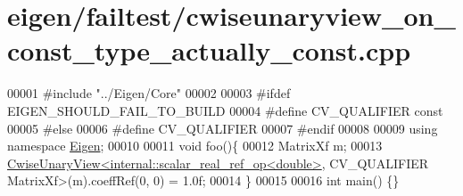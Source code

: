 \hypertarget{eigen_2failtest_2cwiseunaryview__on__const__type__actually__const_8cpp_source}{}\section{eigen/failtest/cwiseunaryview\+\_\+on\+\_\+const\+\_\+type\+\_\+actually\+\_\+const.cpp}
\label{eigen_2failtest_2cwiseunaryview__on__const__type__actually__const_8cpp_source}

\begin{DoxyCode}
00001 \textcolor{preprocessor}{#include "../Eigen/Core"}
00002 
00003 \textcolor{preprocessor}{#ifdef EIGEN\_SHOULD\_FAIL\_TO\_BUILD}
00004 \textcolor{preprocessor}{#define CV\_QUALIFIER const}
00005 \textcolor{preprocessor}{#else}
00006 \textcolor{preprocessor}{#define CV\_QUALIFIER}
00007 \textcolor{preprocessor}{#endif}
00008 
00009 \textcolor{keyword}{using namespace }\hyperlink{namespace_eigen}{Eigen};
00010 
00011 \textcolor{keywordtype}{void} foo()\{
00012     MatrixXf m;
00013     \hyperlink{group___core___module_class_eigen_1_1_cwise_unary_view}{CwiseUnaryView<internal::scalar\_real\_ref\_op<double>},
      CV\_QUALIFIER MatrixXf>(m).coeffRef(0, 0) = 1.0f;
00014 \}
00015 
00016 \textcolor{keywordtype}{int} main() \{\}
\end{DoxyCode}
